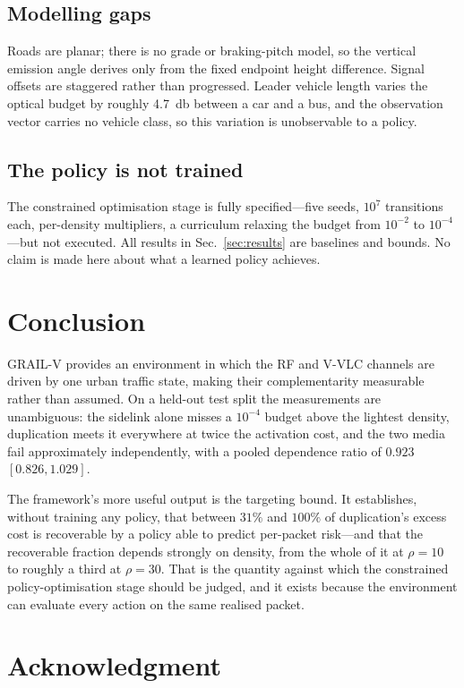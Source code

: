 \documentclass[conference]{IEEEtran}
\begin{document}
\subsection{Modelling gaps}

Roads are planar; there is no grade or braking-pitch model, so the vertical
emission angle derives only from the fixed endpoint height difference.
Signal offsets are staggered rather than progressed. Leader vehicle length
varies the optical budget by roughly \SI{4.7}{\decibel} between a car and a
bus, and the observation vector carries no vehicle class, so this variation is
unobservable to a policy.

\subsection{The policy is not trained}

The constrained optimisation stage is fully specified---five seeds,
$10^{7}$ transitions each, per-density multipliers, a curriculum relaxing the
budget from $10^{-2}$ to $10^{-4}$---but not executed. All results in
Sec.~\ref{sec:results} are baselines and bounds. No claim is made here about
what a learned policy achieves.

\section{Conclusion}

GRAIL-V provides an environment in which the RF and V-VLC channels are driven
by one urban traffic state, making their complementarity measurable rather
than assumed. On a held-out test split the measurements are unambiguous: the
sidelink alone misses a $10^{-4}$ budget above the lightest density,
duplication meets it everywhere at twice the activation cost, and the two
media fail approximately independently, with a pooled dependence ratio of
$0.923$ $[0.826,1.029]$.

The framework's more useful output is the targeting bound. It establishes,
without training any policy, that between $31\%$ and $100\%$ of duplication's
excess cost is recoverable by a policy able to predict per-packet risk---and
that the recoverable fraction depends strongly on density, from the whole of it
at $\rho=10$ to roughly a third at $\rho=30$. That is the
quantity against which the constrained policy-optimisation stage should be
judged, and it exists because the environment can evaluate every action on the
same realised packet.

\section*{Acknowledgment}
\end{document}
